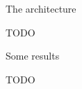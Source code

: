 \documentclass{beamer}
\begin{document}
    \begin{frame}{The architecture}

        TODO

    \end{frame}

    \begin{frame}{Some results}

        TODO

    \end{frame}



%
%
%
\end{document}
